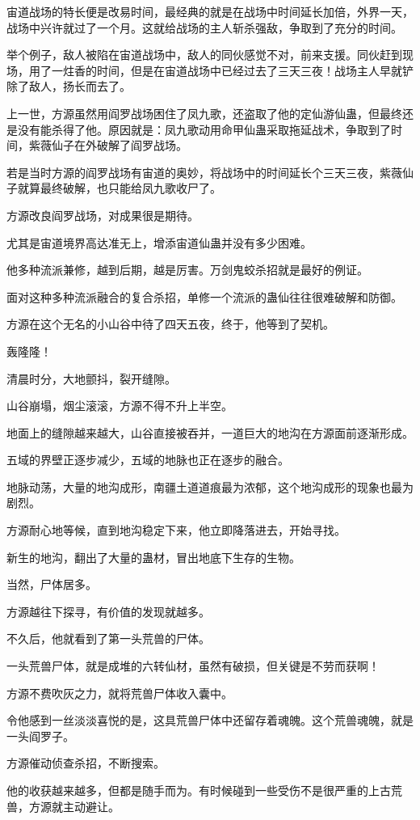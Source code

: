 \begin{this_body}
宙道战场的特长便是改易时间，最经典的就是在战场中时间延长加倍，外界一天，战场中兴许就过了一个月。这就给战场的主人斩杀强敌，争取到了充分的时间。

举个例子，敌人被陷在宙道战场中，敌人的同伙感觉不对，前来支援。同伙赶到现场，用了一炷香的时间，但是在宙道战场中已经过去了三天三夜！战场主人早就铲除了敌人，扬长而去了。

上一世，方源虽然用阎罗战场困住了凤九歌，还盗取了他的定仙游仙蛊，但最终还是没有能杀得了他。原因就是：凤九歌动用命甲仙蛊采取拖延战术，争取到了时间，紫薇仙子在外破解了阎罗战场。

若是当时方源的阎罗战场有宙道的奥妙，将战场中的时间延长个三天三夜，紫薇仙子就算最终破解，也只能给凤九歌收尸了。

方源改良阎罗战场，对成果很是期待。

尤其是宙道境界高达准无上，增添宙道仙蛊并没有多少困难。

他多种流派兼修，越到后期，越是厉害。万剑鬼蛟杀招就是最好的例证。

面对这种多种流派融合的复合杀招，单修一个流派的蛊仙往往很难破解和防御。

方源在这个无名的小山谷中待了四天五夜，终于，他等到了契机。

轰隆隆！

清晨时分，大地颤抖，裂开缝隙。

山谷崩塌，烟尘滚滚，方源不得不升上半空。

地面上的缝隙越来越大，山谷直接被吞并，一道巨大的地沟在方源面前逐渐形成。

五域的界壁正逐步减少，五域的地脉也正在逐步的融合。

地脉动荡，大量的地沟成形，南疆土道道痕最为浓郁，这个地沟成形的现象也最为剧烈。

方源耐心地等候，直到地沟稳定下来，他立即降落进去，开始寻找。

新生的地沟，翻出了大量的蛊材，冒出地底下生存的生物。

当然，尸体居多。

方源越往下探寻，有价值的发现就越多。

不久后，他就看到了第一头荒兽的尸体。

一头荒兽尸体，就是成堆的六转仙材，虽然有破损，但关键是不劳而获啊！

方源不费吹灰之力，就将荒兽尸体收入囊中。

令他感到一丝淡淡喜悦的是，这具荒兽尸体中还留存着魂魄。这个荒兽魂魄，就是一头阎罗子。

方源催动侦查杀招，不断搜索。

他的收获越来越多，但都是随手而为。有时候碰到一些受伤不是很严重的上古荒兽，方源就主动避让。


\end{this_body}
